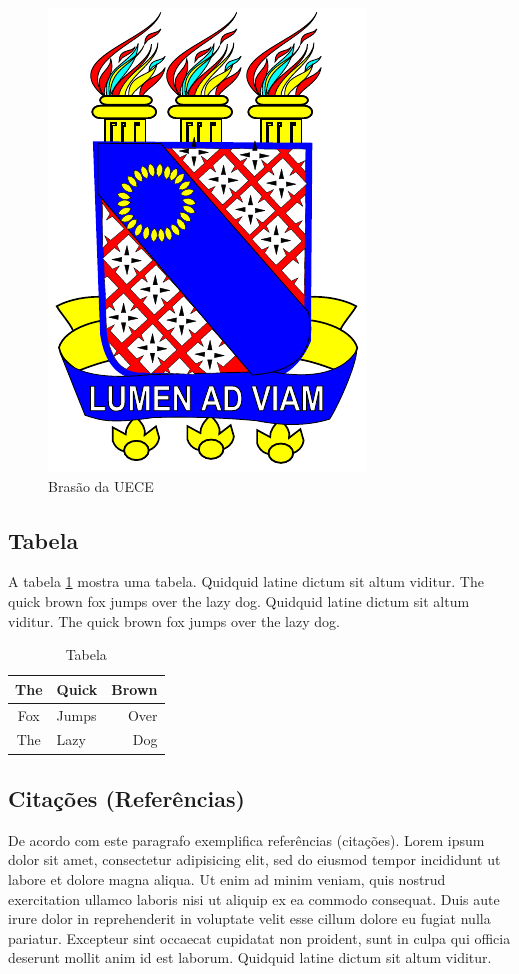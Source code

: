 \begin{figure}[htbp]
\centering
\includegraphics[width=.30\textwidth]{fig/uece}
\caption{Brasão da UECE}
\label{fig:graph}
\end{figure}


\subsection{Tabela}

A tabela \ref{tab:tabela} mostra uma tabela. Quidquid latine dictum sit altum
viditur. The quick brown fox jumps over the lazy dog. Quidquid latine dictum
sit altum viditur. The quick brown fox jumps over the lazy dog.

\begin{table}[htbp]
	\caption{Tabela}
	\label{tab:tabela}
	\centering
	\begin{tabular}{|c|l|r|}
		\hline
		The 	&	Quick 	&	Brown	\\
		\hline
		Fox	&	Jumps	&	Over	\\
		The	&	Lazy	&	Dog	\\
		\hline 
	\end{tabular}
\end{table} 


\subsection{Citações (Referências)}

De acordo com \cite{DEAD:1666,BEEF:1234} este paragrafo exemplifica referências
(citações). Lorem ipsum dolor sit amet, consectetur adipisicing elit, sed do
eiusmod tempor incididunt ut labore et dolore magna aliqua. Ut enim ad minim
veniam, quis nostrud exercitation ullamco laboris nisi ut aliquip ex ea commodo
consequat. Duis aute irure dolor in reprehenderit in voluptate velit esse
cillum dolore eu fugiat nulla pariatur. Excepteur sint occaecat cupidatat non
proident, sunt in culpa qui officia deserunt mollit anim id est laborum.
Quidquid latine dictum sit altum viditur.

